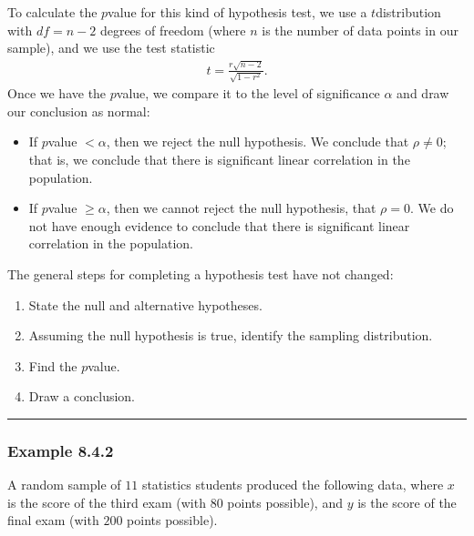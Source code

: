 \documentclass[letterpaper,10pt,english]{jupyterBook}
\begin{document}
\sphinxAtStartPar
To calculate the \(p\)\sphinxhyphen{}value for this kind of hypothesis test, we use a \(t\)\sphinxhyphen{}distribution with \(df = n - 2\) degrees of freedom (where \(n\) is the number of data points in our sample), and we use the test statistic
\begin{equation*}
\begin{split} t = \frac{r \sqrt{n - 2}}{\sqrt{1 - r^2}}. \end{split}
\end{equation*}
\sphinxAtStartPar
Once we have the \(p\)\sphinxhyphen{}value, we compare it to the level of significance \(\alpha\) and draw our conclusion as normal:
\begin{itemize}
\item {} 
\sphinxAtStartPar
If \(p\)\sphinxhyphen{}value \(< \alpha\), then we reject the null hypothesis. We conclude that \(\rho \neq 0\); that is, we conclude that there is significant linear correlation in the population.

\item {} 
\sphinxAtStartPar
If \(p\)\sphinxhyphen{}value \(\geq \alpha\), then we cannot reject the null hypothesis, that \(\rho = 0\). We do not have enough evidence to conclude that there is significant linear correlation in the population.

\end{itemize}

\sphinxAtStartPar
The general steps for completing a hypothesis test have not changed:
\begin{enumerate}
%
\item {} 
\sphinxAtStartPar
State the null and alternative hypotheses.

\item {} 
\sphinxAtStartPar
Assuming the null hypothesis is true, identify the sampling distribution.

\item {} 
\sphinxAtStartPar
Find the \(p\)\sphinxhyphen{}value.

\item {} 
\sphinxAtStartPar
Draw a conclusion.

\end{enumerate}


\bigskip\hrule\bigskip



\subsubsection{Example 8.4.2}
\label{\detokenize{Ch8 Correlation and Linear Regression/8.4 The Correlation Coefficient:example-8-4-2}}
\sphinxAtStartPar
A random sample of \(11\) statistics students produced the following data, where \(x\) is the score of the third exam (with \(80\) points possible), and \(y\) is the score of the final exam (with \(200\) points possible).
\end{document}
